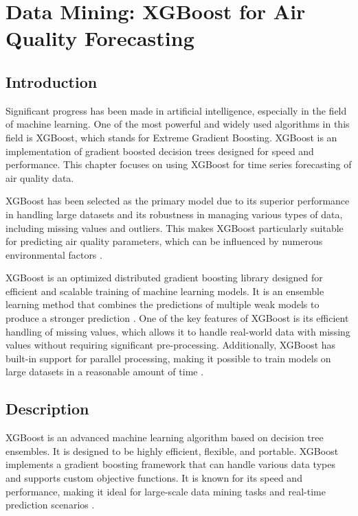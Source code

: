 %
%
%

\chapter{Data Mining: XGBoost for Air Quality Forecasting}
\label{chapter 5}

\section{Introduction}

Significant progress has been made in artificial intelligence, especially in the field of machine learning. One of the most powerful and widely used algorithms in this field is XGBoost, which stands for Extreme Gradient Boosting. XGBoost is an implementation of gradient boosted decision trees designed for speed and performance. This chapter focuses on using XGBoost for time series forecasting of air quality data.

XGBoost has been selected as the primary model due to its superior performance in handling large datasets and its robustness in managing various types of data, including missing values and outliers. This makes XGBoost particularly suitable for predicting air quality parameters, which can be influenced by numerous environmental factors \cite{Chen:2016}.

XGBoost is an optimized distributed gradient boosting library designed for efficient and scalable training of machine learning models. It is an ensemble learning method that combines the predictions of multiple weak models to produce a stronger prediction \cite{Chen:2016}. One of the key features of XGBoost is its efficient handling of missing values, which allows it to handle real-world data with missing values without requiring significant pre-processing. Additionally, XGBoost has built-in support for parallel processing, making it possible to train models on large datasets in a reasonable amount of time \cite{Chen:2016}.

\section{Description}

XGBoost is an advanced machine learning algorithm based on decision tree ensembles. It is designed to be highly efficient, flexible, and portable. XGBoost implements a gradient boosting framework that can handle various data types and supports custom objective functions. It is known for its speed and performance, making it ideal for large-scale data mining tasks and real-time prediction scenarios \cite{Goodfellow:2016}.

